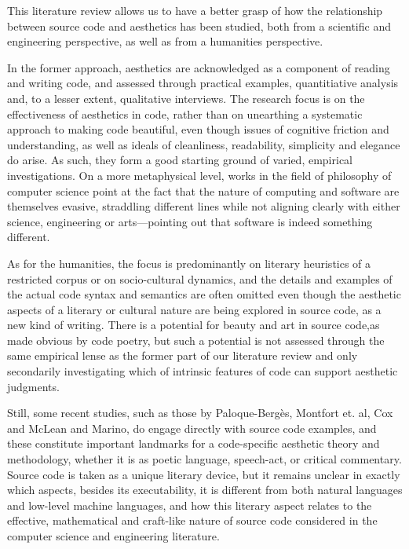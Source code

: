 \vspace*{1\baselineskip}

This literature review allows us to have a better grasp of how the relationship between source code and aesthetics has been studied, both from a scientific and engineering perspective, as well as from a humanities perspective.

In the former approach, aesthetics are acknowledged as a component of reading and writing code, and assessed through practical examples, quantitiative analysis and, to a lesser extent, qualitative interviews. The research focus is on the effectiveness of aesthetics in code, rather than on unearthing a systematic approach to making code beautiful, even though issues of cognitive friction and understanding, as well as ideals of cleanliness, readability, simplicity and elegance do arise. As such, they form a good starting ground of varied, empirical investigations.
On a more metaphysical level, works in the field of philosophy of computer science point at the fact that the nature of computing and software are themselves evasive, straddling different lines while not aligning clearly with either science, engineering or arts—pointing out that software is indeed something different.

As for the humanities, the focus is predominantly on literary heuristics of a restricted corpus or on socio-cultural dynamics, and the details and examples of the actual code syntax and semantics are often omitted even though the aesthetic aspects of a literary or cultural nature are being explored in source code, as a new kind of writing. There is a potential for beauty and art in source code,as made obvious by code poetry, but such a potential is not assessed through the same empirical lense as the former part of our literature review and only secondarily investigating which of intrinsic features of code can support aesthetic judgments.

Still, some recent studies, such as those by Paloque-Bergès, Montfort et. al, Cox and McLean and Marino, do engage directly with source code examples, and these constitute important landmarks for a code-specific aesthetic theory and methodology, whether it is as poetic language, speech-act, or critical commentary. Source code is taken as a unique literary device, but it remains unclear in exactly which aspects, besides its executability, it is different from both natural languages and low-level machine languages, and how this literary aspect relates to the effective, mathematical and craft-like nature of source code considered in the computer science and engineering literature.

